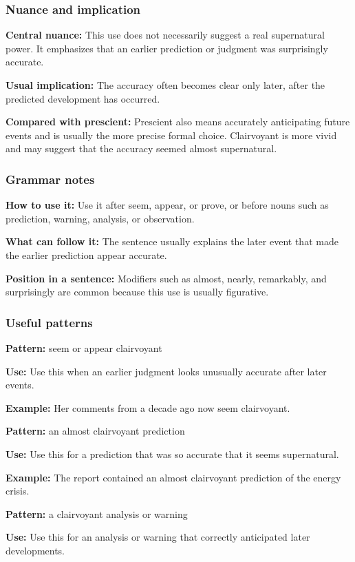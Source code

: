 \documentclass[11pt]{article}
\begin{document}
\subsubsection{Nuance and implication}
\textbf{Central nuance:} This use does not necessarily suggest a real supernatural power. It emphasizes that an earlier prediction or judgment was surprisingly accurate.

\textbf{Usual implication:} The accuracy often becomes clear only later, after the predicted development has occurred.

\textbf{Compared with prescient:} Prescient also means accurately anticipating future events and is usually the more precise formal choice. Clairvoyant is more vivid and may suggest that the accuracy seemed almost supernatural.

\subsubsection{Grammar notes}
\textbf{How to use it:} Use it after seem, appear, or prove, or before nouns such as prediction, warning, analysis, or observation.

\textbf{What can follow it:} The sentence usually explains the later event that made the earlier prediction appear accurate.

\textbf{Position in a sentence:} Modifiers such as almost, nearly, remarkably, and surprisingly are common because this use is usually figurative.

\subsubsection{Useful patterns}
\textbf{Pattern:} seem or appear clairvoyant

\textbf{Use:} Use this when an earlier judgment looks unusually accurate after later events.

\textbf{Example:} Her comments from a decade ago now seem clairvoyant.

\textbf{Pattern:} an almost clairvoyant prediction

\textbf{Use:} Use this for a prediction that was so accurate that it seems supernatural.

\textbf{Example:} The report contained an almost clairvoyant prediction of the energy crisis.

\textbf{Pattern:} a clairvoyant analysis or warning

\textbf{Use:} Use this for an analysis or warning that correctly anticipated later developments.
\end{document}
